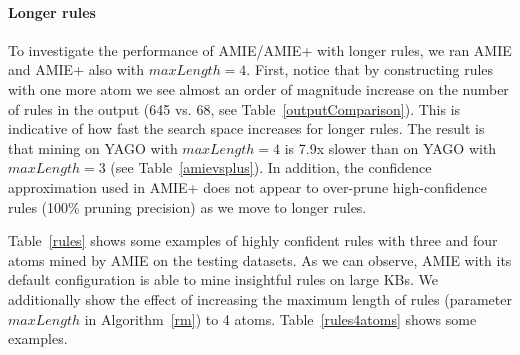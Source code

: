 \paragraph{Longer rules}
To investigate the performance of AMIE/AMIE+ with longer rules,  we ran AMIE and AMIE+ also with $maxLength=4$.  
First, notice that by constructing rules with one more atom we see almost an order of magnitude increase on the number of rules in the output (645 vs. 68, see Table~\ref{outputComparison}). 
This is indicative of how fast the search space increases for longer rules. The result is that mining on YAGO with $maxLength=4$ is 7.9x slower than on YAGO with $maxLength=3$ (see Table~\ref{amievsplus}).
In addition, the confidence approximation used in AMIE+ does not appear to over-prune high-confidence rules (100\% pruning precision) as we move to longer rules.

Table~\ref{rules} shows some examples of highly confident rules with three and four atoms mined by AMIE on the testing datasets.
As we can observe, AMIE with its default configuration is able to mine insightful rules on large KBs. We additionally show the effect
of increasing the maximum length of rules (parameter $maxLength$ in Algorithm~\ref{rm}) to 4 atoms. Table~\ref{rules4atoms} shows
some examples.

